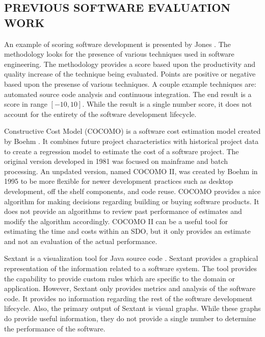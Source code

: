 \documentclass[SDSUThesis.tex]{subfiles}
\begin{document}
\subsection{PREVIOUS SOFTWARE EVALUATION WORK}

    An example of scoring software development is presented by 
    Jones \cite{Jones2012}. The methodology looks
    for the presence of various techniques used in software engineering.  
    The methodology provides a score based upon the 
    productivity and quality increase of the technique being evaluated.  
    Points are positive or negative based upon the 
    presense of various techniques. A couple example techniques are: 
    automated source code analysis and continuous integration.  The end 
    result is a score in range $[-10,10]$. 
    While the result is a single number score, it does not account for the 
    entirety of the software development lifecycle.

    Constructive Cost Model (COCOMO) is a software cost estimation model created
    by Boehm \cite{Boehm1981}.  It combines future project characteristics
    with historical project data to create a regression model to estimate the 
    cost of a software project.  The original version developed in 1981 was
    focused on mainframe and batch processing.  An unpdated version, named
    COCOMO II, was created by Boehm in 1995 to be more flexible for newer 
    development practices such as desktop development, off the shelf components,
    and code reuse.  COCOMO provides a nice algorithm for making decisions
    regarding building or buying software products.  It does not provide 
    an algorithms to review past performance of estimates and modify the
    algorithm accordingly.  COCOMO II can be a useful tool for 
    estimating the time and costs within an SDO,
    but it only provides an estimate and not an evaluation of the actual
    performance. 
    
    Sextant is a visualization tool for Java source code \cite{Winter2013}.  
    Sextant provides a graphical representation of the information related 
    to a software system.  The tool provides the capability to provide 
    custom rules which are specific to the domain or application.  However,
    Sextant only provides metrics and analysis of the software code.  
    It provides no information regarding the rest of the 
    software development lifecycle.  Also, the primary output of Sextant 
    is visual graphs.  While these graphs do provide
    useful information, they do not provide a single number 
    to determine the performance of the software.
\end{document}
